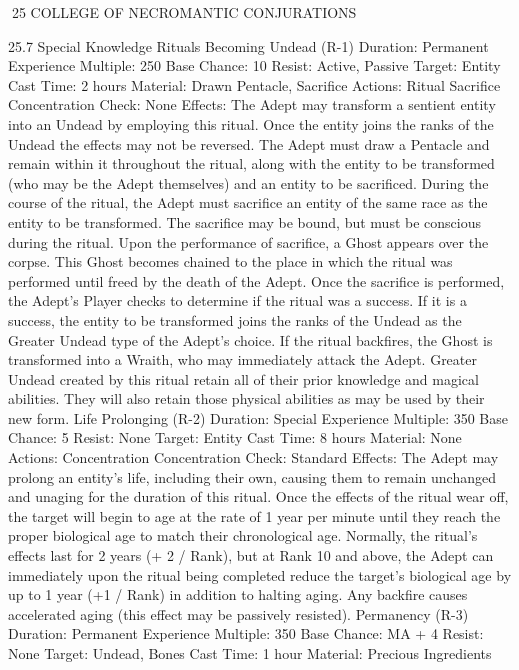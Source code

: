 \documentclass[a4paper]{article}
\begin{document}
\begin{multicols}{3}
25 COLLEGE OF NECROMANTIC CONJURATIONS

25.7 Special Knowledge Rituals
Becoming Undead (R-1)
Duration: Permanent
Experience Multiple: 250
Base Chance: 10%
Resist: Active, Passive
Target: Entity
Cast Time: 2 hours
Material: Drawn Pentacle, Sacrifice
Actions: Ritual Sacrifice
Concentration Check: None
Effects: The Adept may transform a sentient entity
into an Undead by employing this ritual. Once the
entity joins the ranks of the Undead the effects may
not be reversed. The Adept must draw a Pentacle
and remain within it throughout the ritual, along
with the entity to be transformed (who may be the
Adept themselves) and an entity to be sacrificed.
During the course of the ritual, the Adept must
sacrifice an entity of the same race as the entity to
be transformed. The sacrifice may be bound, but
must be conscious during the ritual. Upon the
performance of sacrifice, a Ghost appears over the
corpse. This Ghost becomes chained to the place in
which the ritual was performed until freed by the
death of the Adept. Once the sacrifice is performed, the Adept’s Player checks to determine if
the ritual was a success. If it is a success, the entity
to be transformed joins the ranks of the Undead as
the Greater Undead type of the Adept’s choice. If
the ritual backfires, the Ghost is transformed into a
Wraith, who may immediately attack the Adept.
Greater Undead created by this ritual retain all of
their prior knowledge and magical abilities. They
will also retain those physical abilities as may be
used by their new form.
Life Prolonging (R-2)
Duration: Special
Experience Multiple: 350
Base Chance: 5%
Resist: None
Target: Entity
Cast Time: 8 hours
Material: None
Actions: Concentration
Concentration Check: Standard
Effects: The Adept may prolong an entity’s life,
including their own, causing them to remain unchanged and unaging for the duration of this ritual.
Once the effects of the ritual wear off, the target
will begin to age at the rate of 1 year per minute
until they reach the proper biological age to match
their chronological age. Normally, the ritual’s
effects last for 2 years (+ 2 / Rank), but at Rank 10
and above, the Adept can immediately upon the
ritual being completed reduce the target’s biological age by up to 1 year (+1 / Rank) in addition to
halting aging. Any backfire causes accelerated
aging (this effect may be passively resisted).
Permanency (R-3)
Duration: Permanent
Experience Multiple: 350
Base Chance: MA + 4%
Resist: None
Target: Undead, Bones
Cast Time: 1 hour
Material: Precious Ingredients


\end{multicols}
\end{document}
